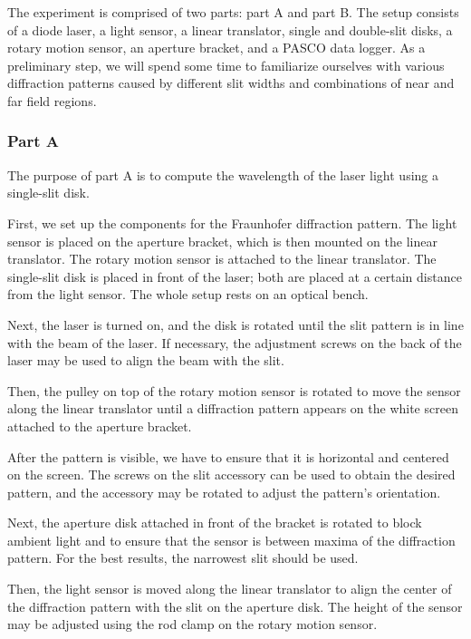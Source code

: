 \documentclass[10pt]{article}
\begin{document}
The experiment is comprised of two parts: part A and part B. The setup consists of a diode laser, a light sensor, a linear translator, single and double-slit disks, a rotary motion sensor, an aperture bracket, and a PASCO{\textsuperscript\textregistered} data logger. As a preliminary step, we will spend some time to familiarize ourselves with various diffraction patterns caused by different slit widths and combinations of near and far field regions.

\subsubsection*{Part A}

The purpose of part A is to compute the wavelength of the laser light using a single-slit disk.

First, we set up the components for the Fraunhofer diffraction pattern. The light sensor is placed on the aperture bracket, which is then mounted on the linear translator. The rotary motion sensor is attached to the linear translator. The single-slit disk is placed in front of the laser; both are placed at a certain distance from the light sensor. The whole setup rests on an optical bench.

Next, the laser is turned on, and the disk is rotated until the slit pattern is in line with the beam of the laser. If necessary, the adjustment screws on the back of the laser may be used to align the beam with the slit. 

Then, the pulley on top of the rotary motion sensor is rotated to move the sensor along the linear translator until a diffraction pattern appears on the white screen attached to the aperture bracket. 

After the pattern is visible, we have to ensure that it is horizontal and centered on the screen. The screws on the slit accessory can be used to obtain the desired pattern, and the accessory may be rotated to adjust the pattern's orientation.

Next, the aperture disk attached in front of the bracket is rotated to block ambient light and to ensure that the sensor is between maxima of the diffraction pattern. For the best results, the narrowest slit should be used.

Then, the light sensor is moved along the linear translator to align the center of the diffraction pattern with the slit on the aperture disk. The height of the sensor may be adjusted using the rod clamp on the rotary motion sensor.
\end{document}
